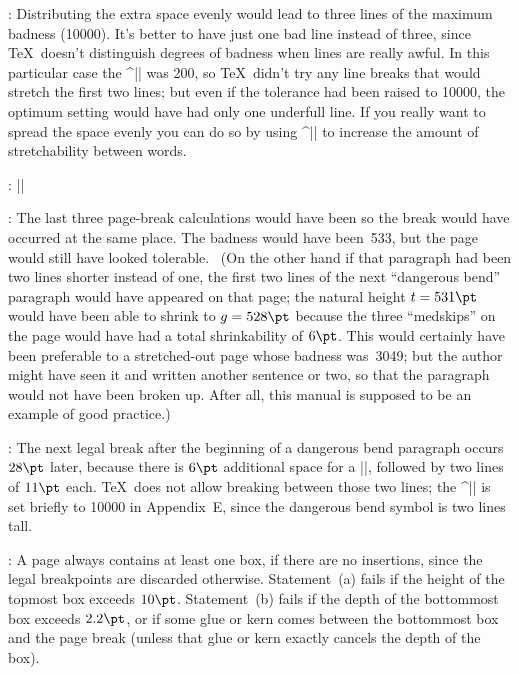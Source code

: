 {{:
 Distributing the extra space evenly would lead to three lines of
the maximum badness (10000). It's better to have just one bad line
instead of three, since \TeX\ doesn't distinguish degrees of badness when
lines are really awful. In this particular case the ^|\tolerance| was 200,
so \TeX\ didn't try any line breaks that would stretch the first two lines;
but even if the tolerance had been raised to 10000, the optimum setting would
have had only one underfull line. If you really want to spread the
space evenly you can do so by using ^|\spaceskip| to increase the
amount of stretchability between words.

:
 |\def\raggedcenter{\leftskip=0pt plus4em \rightskip=\leftskip|%
\parbreak|\parfillskip=0pt \spaceskip=.3333em \xspaceskip=.5em|\parbreak
        |\pretolerance=9999 \tolerance=9999 \parindent=0pt|\parbreak
        |\hyphenpenalty=9999 \exhyphenpenalty=9999 }|

:
 The last three page-break calculations would have been
\begintt
\endtt
so the break would have occurred at the same place. The badness would have
been~533, but the page would still have looked tolerable. \ (On the other
hand if that paragraph had been two lines shorter instead of one,
the first two lines of the next ``dangerous bend'' paragraph
would have appeared on that page; the natural height $t=531\pt$ would have
been able to shrink to $g=528\pt$ because the three ``medskips'' on
the page would have had a total shrinkability of $6\pt$. This would certainly
have been preferable to a stretched-out page whose badness was~3049; but the
author might have seen it and written another sentence or two, so that
the paragraph would not have been broken up. After all, this manual is supposed
to be an example of good practice.)

:
 The next legal break after the beginning of a dangerous bend
paragraph occurs $28\pt$ later, because there is $6\pt$ additional space for
a |\medskip|, followed by two lines of $11\pt$ each. \TeX\ does not
allow breaking between those two lines; the ^|\clubpenalty| is set briefly
to 10000 in Appendix~E\null, since the dangerous bend symbol is two lines tall.

:
 A page always contains at least one box, if there are no
insertions, since the legal breakpoints are discarded otherwise.
Statement~(a) fails if the height of the topmost box exceeds $10\pt$.
Statement~(b) fails if the depth of the bottommost box exceeds $2.2\pt$, or
if some glue or kern comes between the bottommost box and the page break
(unless that glue or kern exactly cancels the depth of the box).

}}
